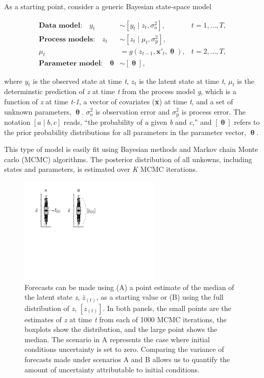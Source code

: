 \documentclass[12pt,]{article}
\begin{document}
As a starting point, consider a generic Bayesian state-space model

\begin{align}
\textbf{Data model:} \quad y_t &\sim \left[y_t \;|\; z_t, \sigma^2_{\text{o}}\right], &t = 1,\dots,T, \\
\textbf{Process models:} \quad z_t &\sim \left[z_t \;|\; \mu_t, \sigma^2_{\text{p}}\right],  \\
\mu_t &= g \left(z_{t-1},\textbf{x}'_t, \bm{\uptheta} \right), &t = 2,\dots,T, \\
\textbf{Parameter model:} \quad \bm{\uptheta} &\sim \left[\bm{\uptheta}\right],
\end{align}

\noindent{}where \(y_t\) is the observed state at time \emph{t}, \(z_t\)
is the latent state at time \emph{t}, \(\mu_t\) is the determinstic
prediction of \emph{z} at time \emph{t} from the process model \emph{g},
which is a function of \emph{z} at time \emph{t-1}, a vector of
covariates (\textbf{x}) at time \emph{t}, and a set of unknown
parameters, \(\bm{\uptheta}\). \(\sigma^2_{\text{o}}\) is observation
error and \(\sigma^2_{\text{p}}\) is process error. The notation
\(\left[a \;|\; b, c\right]\) reads, ``the probability of \emph{a} given
\emph{b} and \emph{c},'' and \(\left[\bm{\uptheta}\right]\) refers to
the prior probability distributions for all parameters in the parameter
vector, \(\bm{\uptheta}\).

This type of model is easily fit using Bayesian methods and Markov chain
Monte carlo (MCMC) algorithms. The posterior distribution of all
unkowns, including states and parameters, is estimated over \emph{K}
MCMC iterations.

\begin{figure}
\centering
\includegraphics[width=\textwidth,height=2in]{../figures/init_cond_example.pdf}
\caption{Forecasts can be made using (A) a point estimate of the median
of the latent state \emph{z}, \(\bar{z}_{(t)}\), as a starting value or
(B) using the full distribution of \emph{z}, \([z_{(t)}]\). In both
panels, the small points are the estimates of \emph{z} at time \emph{t}
from each of 1000 MCMC iterations, the boxplots show the distribution,
and the large point shows the median. The scenario in A represents the
case where initial conditions uncertainty is set to zero. Comparing the
variance of forecasts made under scenarios A and B allows us to quantify
the amount of uncertainty attributable to initial conditions.}
\end{figure}
\end{document}
